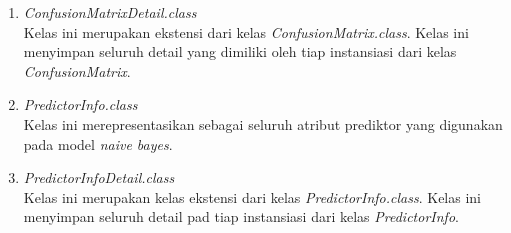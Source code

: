 \begin{enumerate}
\item{\textit{ConfusionMatrixDetail.class}} \\
Kelas ini merupakan ekstensi dari kelas \textit{ConfusionMatrix.class}. Kelas ini menyimpan seluruh detail yang dimiliki oleh tiap instansiasi dari kelas \textit{ConfusionMatrix}.
\item{\textit{PredictorInfo.class}} \\
Kelas ini merepresentasikan sebagai seluruh atribut prediktor yang digunakan pada model \textit{naive bayes}.
\item{\textit{PredictorInfoDetail.class}} \\
Kelas ini merupakan kelas ekstensi dari kelas \textit{PredictorInfo.class}. Kelas ini menyimpan seluruh detail pad tiap instansiasi dari kelas \textit{PredictorInfo}.
\end{enumerate}
